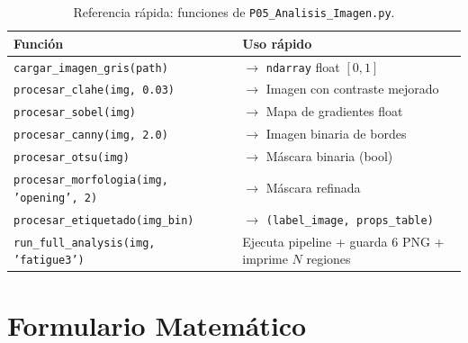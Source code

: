 \documentclass[12pt,a4paper]{article}
\begin{document}
\begin{table}[H]
	\centering
	\caption{Referencia rápida: funciones de \texttt{P05\_Analisis\_Imagen.py}.}
	\label{tab:ref_python}
	\small
	\begin{tabularx}{\textwidth}{l X}
		\toprule
		\textbf{Función} & \textbf{Uso rápido}                                    \\
		\midrule
		\texttt{cargar\_imagen\_gris(path)}
		                 & $\rightarrow$ \texttt{ndarray} float $[0,1]$           \\
		\texttt{procesar\_clahe(img, 0.03)}
		                 & $\rightarrow$ Imagen con contraste mejorado            \\
		\texttt{procesar\_sobel(img)}
		                 & $\rightarrow$ Mapa de gradientes float                 \\
		\texttt{procesar\_canny(img, 2.0)}
		                 & $\rightarrow$ Imagen binaria de bordes                 \\
		\texttt{procesar\_otsu(img)}
		                 & $\rightarrow$ Máscara binaria (bool)                   \\
		\texttt{procesar\_morfologia(img, 'opening', 2)}
		                 & $\rightarrow$ Máscara refinada                         \\
		\texttt{procesar\_etiquetado(img\_bin)}
		                 & $\rightarrow$ \texttt{(label\_image, props\_table)}    \\
		\texttt{run\_full\_analysis(img, 'fatigue3')}
		                 & Ejecuta pipeline + guarda 6 PNG + imprime $N$ regiones \\
		\bottomrule
	\end{tabularx}
\end{table}

\section{Formulario Matemático}
\label{sec:appendix_formulas}
\end{document}
